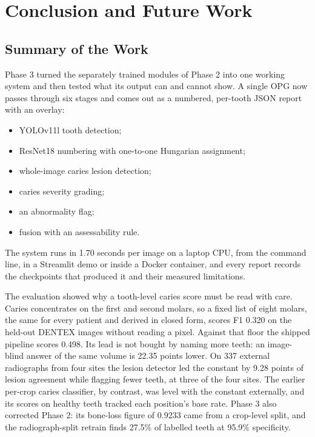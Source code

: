 \chapter{Conclusion and Future Work}
\label{ch:conclusion}

\section{Summary of the Work}

Phase 3 turned the separately trained modules of Phase 2 into one working system and then tested what
its output can and cannot show. A single OPG now passes through six stages and comes out as a numbered,
per-tooth JSON report with an overlay:
\begin{itemize}
\item YOLOv11l tooth detection;
\item ResNet18 numbering with one-to-one Hungarian assignment;
\item whole-image caries lesion detection;
\item caries severity grading;
\item an abnormality flag;
\item fusion with an assessability rule.
\end{itemize}
The system runs in 1.70 seconds per image on a laptop CPU, from the command line, in a Streamlit demo or
inside a Docker container, and every report records the checkpoints that produced it and their measured
limitations.

The evaluation showed why a tooth-level caries score must be read with care. Caries concentrates on the
first and second molars, so a fixed list of eight molars, the same for every patient and derived in
closed form, scores F1 0.320 on the held-out DENTEX images without reading a pixel. Against that floor
the shipped pipeline scores 0.498. Its lead is not bought by naming more teeth: an image-blind answer of
the same volume is 22.35 points lower. On 337 external radiographs from four sites the lesion detector
led the constant by 9.28 points of lesion agreement while flagging fewer teeth, at three of the four
sites. The earlier per-crop caries classifier, by contrast, was level with the constant externally, and
its scores on healthy teeth tracked each position's base rate. Phase 3 also corrected Phase 2: its
bone-loss figure of 0.9233 came from a crop-level split, and the radiograph-split retrain finds 27.5\%
of labelled teeth at 95.9\% specificity. %

